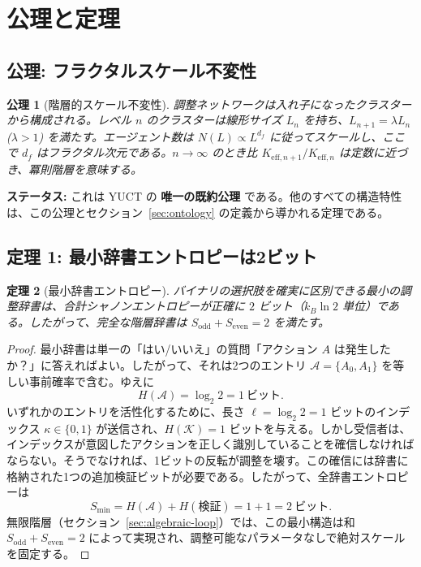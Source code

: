 \documentclass[12pt,a4paper]{article}
\newtheorem{theorem}{定理}[section]
\newtheorem{axiom}[theorem]{公理}
\begin{document}
	\section{公理と定理}
	\label{sec:axioms}
	
	\subsection{公理: フラクタルスケール不変性}
	
	\begin{axiom}[階層的スケール不変性] \label{ax:A1}
		調整ネットワークは入れ子になったクラスターから構成される。レベル \(n\) のクラスターは線形サイズ \(L_n\) を持ち、\(L_{n+1} = \lambda L_n\) (\(\lambda > 1\)) を満たす。エージェント数は \(N(L) \propto L^{d_f}\) に従ってスケールし、ここで \(d_f\) はフラクタル次元である。\(n \to \infty\) のとき比 \(K_{\mathrm{eff},n+1}/K_{\mathrm{eff},n}\) は定数に近づき、冪則階層を意味する。
	\end{axiom}
	
	\textbf{ステータス:} これは YUCT の \textbf{唯一の既約公理} である。他のすべての構造特性は、この公理とセクション~\ref{sec:ontology} の定義から導かれる定理である。
	
	\subsection{定理 1: 最小辞書エントロピーは2ビット}
	
	\begin{theorem}[最小辞書エントロピー]
		\label{thm:minimal-dict}
		バイナリの選択肢を確実に区別できる最小の調整辞書は、合計シャノンエントロピーが正確に \(2\) ビット（\(k_B\ln 2\) 単位）である。したがって、完全な階層辞書は \(S_{\mathrm{odd}} + S_{\mathrm{even}} = 2\) を満たす。
	\end{theorem}
	
	\begin{proof}
		最小辞書は単一の「はい/いいえ」の質問「アクション \(A\) は発生したか？」に答えればよい。したがって、それは2つのエントリ \(\mathcal{A} = \{A_0, A_1\}\) を等しい事前確率で含む。ゆえに
		\[
		H(\mathcal{A}) = \log_2 2 = 1\ \text{ビット}.
		\]
		いずれかのエントリを活性化するために、長さ \(\ell = \log_2 2 = 1\) ビットのインデックス \(\kappa \in \{0,1\}\) が送信され、\(H(\mathcal{K}) = 1\) ビットを与える。しかし受信者は、インデックスが意図したアクションを正しく識別していることを確信しなければならない。そうでなければ、1ビットの反転が調整を壊す。この確信には辞書に格納された1つの追加検証ビットが必要である。したがって、全辞書エントロピーは
		\[
		S_{\min} = H(\mathcal{A}) + H(\text{検証}) = 1 + 1 = 2\ \text{ビット}.
		\]
		無限階層（セクション~\ref{sec:algebraic-loop}）では、この最小構造は和 \(S_{\mathrm{odd}} + S_{\mathrm{even}} = 2\) によって実現され、調整可能なパラメータなしで絶対スケールを固定する。
	\end{proof}
	
\end{document}
